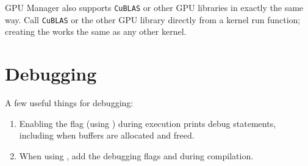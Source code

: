 GPU Manager also supports \texttt{CuBLAS} or other GPU libraries in exactly the same way.
Call \texttt{CuBLAS} or the other GPU library directly from a kernel run function;
creating the  works the same as any other kernel.


\section{Debugging}

A few useful things for debugging:

\begin{enumerate}
\item Enabling the  flag
(using ) during execution prints debug
statements, including when buffers are allocated and freed.

\item When using , add the debugging flags  and
 during compilation.
\end{enumerate}
